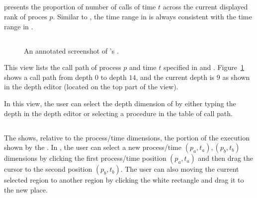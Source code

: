 \subsection{\summaryview}
\label{sec:summaryview}

\summaryview{} presents the proportion of number of calls of time $t$ across the current displayed rank of proces $p$. 
Similar to \depthview, the time range in \summaryview{} is always consistent with the time range in \traceview{}.


\subsection{\callview}
\label{sec:callview}

\begin{figure}[t]
\caption{An annotated screenshot of \hpctraceviewer{}'s \callview.}
\label{fig:hpctraceviewer-callpath-legend}
\end{figure}

This view lists the call path of process $p$ and time $t$ specified in \traceview{} and \depthview.
Figure~\ref{fig:hpctraceviewer-callpath-legend} shows a call path from depth $0$ to depth $14$, and the current depth is $9$ as shown in the depth editor (located on the top part of the view).

In this view, the user can select the depth dimension of \traceview{} by either typing the depth in the depth editor or selecting a procedure in the table of call path.

\subsection{\miniview}
\label{sec:miniview}

The \miniview{} shows, relative to the process/time dimensions, the portion of the execution shown by the \traceview.
In \miniview{}, the user can select a new process/time $(p_a,t_a),(p_b,t_b)$ dimensions by clicking the first process/time position $(p_a,t_a)$ and then drag the cursor to the second position $(p_b,t_b)$.
The user can also moving the current selected region to another region by clicking the white rectangle and drag it to the new place.



